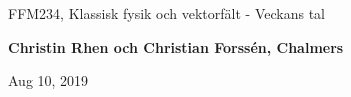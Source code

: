 \documentclass[%
oneside,                 %
final,                   %
10pt]{article}
\begin{document}

\newcommand{\exercisesection}[1]{\subsection*{#1}}






\thispagestyle{empty}

\begin{center}
{\LARGE\bf
\begin{spacing}{1.25}
FFM234, Klassisk fysik och vektorfält - Veckans tal
\end{spacing}
}
\end{center}


\begin{center}
{\bf Christin Rhen och Christian Forssén, Chalmers${}^{}$} \\ [0mm]
\end{center}

\begin{center}
\end{center}
    

\begin{center}
Aug 10, 2019
\end{center}

\vspace{1cm}
\end{document}

